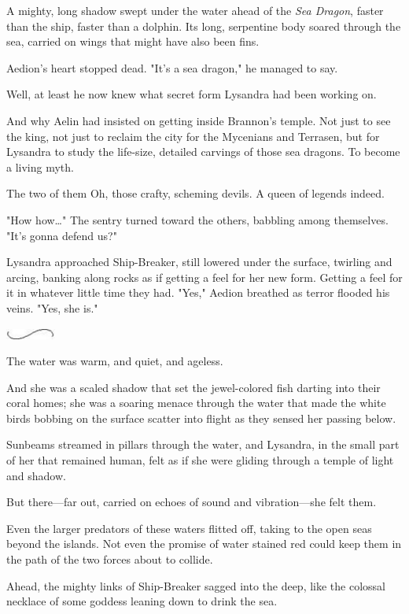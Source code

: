 A mighty, long shadow swept under the water ahead of the \emph{Sea Dragon}, faster than the ship, faster than a dolphin. Its long, serpentine body soared through the sea, carried on wings that might have also been fins.

Aedion's heart stopped dead. "It's a sea dragon," he managed to say.

Well, at least he now knew what secret form Lysandra had been working on.

And why Aelin had insisted on getting inside Brannon's temple. Not just to see the king, not just to reclaim the city for the Mycenians and Terrasen, but  for Lysandra to study the life-size, detailed carvings of those sea dragons. To become a living myth.

The two of them  Oh, those crafty, scheming devils. A queen of legends indeed.

"How  how\ldots" The sentry turned toward the others, babbling among themselves. "It's gonna defend us?"

Lysandra approached Ship-Breaker, still lowered under the surface, twirling and arcing, banking along rocks as if getting a feel for her new form. Getting a feel for it in whatever little time they had. "Yes," Aedion breathed as terror flooded his veins. "Yes, she is."

\includegraphics[width=0.65in,height=0.13in]{images/seperator}

The water was warm, and quiet, and ageless.

And she was a scaled shadow that set the jewel-colored fish darting into their coral homes; she was a soaring menace through the water that made the white birds bobbing on the surface scatter into flight as they sensed her passing below.

Sunbeams streamed in pillars through the water, and Lysandra, in the small part of her that remained human, felt as if she were gliding through a temple of light and shadow.

But there---far out, carried on echoes of sound and vibration---she felt them.

Even the larger predators of these waters flitted off, taking to the open seas beyond the islands. Not even the promise of water stained red could keep them in the path of the two forces about to collide.

Ahead, the mighty links of Ship-Breaker sagged into the deep, like the colossal necklace of some goddess leaning down to drink the sea.

